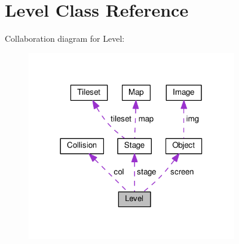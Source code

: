 \hypertarget{classLevel}{}\section{Level Class Reference}
\label{classLevel}


Collaboration diagram for Level\+:
\nopagebreak
\begin{figure}[H]
\begin{center}
\leavevmode
\includegraphics[width=258pt]{classLevel__coll__graph}
\end{center}
\end{figure}
